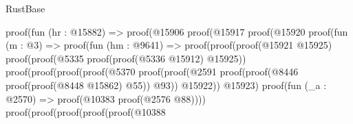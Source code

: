 \begin{lexlean}{RustBase}
\begin{coremodule}
                                                      proof(fun (hr : @15882) =>
                                                        proof(@15906
                                                            proof(@15917
                                                                proof(@15920
                                                                    proof(fun (m : @3) =>
                                                                      proof(fun (hm : @9641) =>
                                                                        proof(proof(proof(@15921
                                                                                @15925)
                                                                              proof(proof(@5335
                                                                                    proof(proof(@5336
                                                                                          @15912)
                                                                                        @15925))
                                                                                  proof(proof(proof(proof(@5370
                                                                                            proof(proof(@2591
                                                                                                  proof(proof(@8446
                                                                                                        proof(proof(@8448
                                                                                                              @15862)
                                                                                                            @55))
                                                                                                      @93))
                                                                                                @15922))
                                                                                          @15923)
                                                                                        proof(fun (_a : @2570) =>
                                                                                          proof(@10383
                                                                                              proof(@2576
                                                                                                  @88))))
                                                                                      proof(proof(proof(proof(proof(@10388

\end{coremodule}
\end{lexlean}

